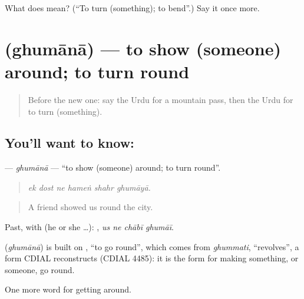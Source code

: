 \begin{tcolorbox}[breakable,colback=teal!4,colframe=teal!35!black,title={Before you move on}]
What does  mean? (\textquotedblleft{}To turn (something); to bend\textquotedblright{}.) Say it once more.
\end{tcolorbox}
\section[\texorpdfstring{\ur{گھمانا} (ghumānā)}{گھمانا (ghumānā)}]{ (ghumānā) — to show (someone) around; to turn round}

\label{lesson:UR-C397-ghumana}



\begin{quote}
Before the new one: say the Urdu for a mountain pass, then the Urdu for to turn (something).
\end{quote}

\subsection*{You'll want to know: }
\textbf{} — \emph{ghumānā} — \textquotedblleft{}to show (someone) around; to turn round\textquotedblright{}.

\begin{quote}
     
\end{quote}

\begin{quote}
\emph{ek dost ne hameṅ shahr ghumāyā.}
\end{quote}

\begin{quote}
A friend showed us round the city.
\end{quote}

Past, with  (he or she …):    , \emph{us ne chābī ghumāī}.

\begin{cousinweb}
\textbf{} (\emph{ghumānā}) is built on \textbf{}, \textquotedblleft{}to go round\textquotedblright{}, which comes from \emph{ghummati}, \textquotedblleft{}revolves\textquotedblright{}, a form CDIAL reconstructs (CDIAL 4485): it is the form for making something, or someone, go round.
\end{cousinweb}

\begin{grammarlens}[title={What you've built}]
One more word for getting around.
\end{grammarlens}

